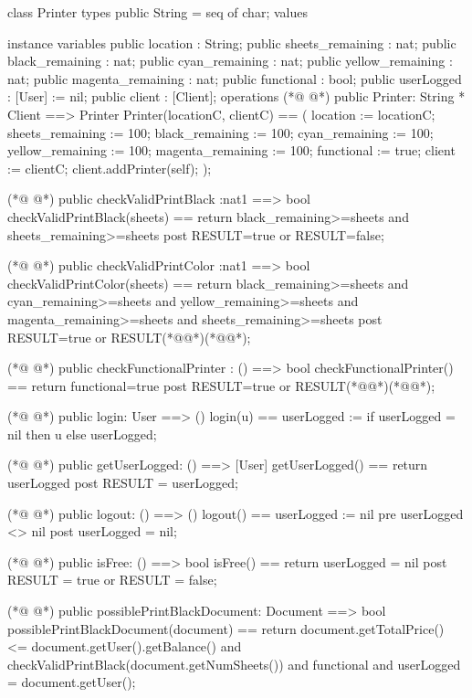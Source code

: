 \begin{vdmpp}[breaklines=true]
class Printer
types
public String = seq of char;
values

instance variables
 public location : String;
 public sheets_remaining : nat;
 public black_remaining : nat;
 public cyan_remaining : nat;
 public yellow_remaining : nat;
 public magenta_remaining : nat;
 public functional : bool;
 public userLogged : [User] := nil;
 public client : [Client];
operations
(*@
\label{Printer:17}
@*)
  public Printer: String * Client  ==> Printer
  Printer(locationC, clientC) == (
   location := locationC;
   sheets_remaining := 100;
   black_remaining := 100;
   cyan_remaining := 100;
   yellow_remaining := 100;
   magenta_remaining := 100;
   functional := true;
   client := clientC;
   client.addPrinter(self);
  );
  
(*@
\label{checkValidPrintBlack:30}
@*)
  public checkValidPrintBlack :nat1 ==> bool
  checkValidPrintBlack(sheets) ==
   return black_remaining>=sheets and sheets_remaining>=sheets
    post RESULT=true or RESULT=false;
    
(*@
\label{checkValidPrintColor:35}
@*)
  public checkValidPrintColor :nat1 ==> bool
  checkValidPrintColor(sheets) == 
   return black_remaining>=sheets and cyan_remaining>=sheets and yellow_remaining>=sheets and 
      magenta_remaining>=sheets and sheets_remaining>=sheets
    post RESULT=true or RESULT(*@\vdmnotcovered{=}@*)(*@@*);
    
(*@
\label{checkFunctionalPrinter:41}
@*)
  public checkFunctionalPrinter : () ==> bool
  checkFunctionalPrinter() ==
   return functional=true
    post RESULT=true or RESULT(*@\vdmnotcovered{=}@*)(*@@*);
    
    
(*@
\label{login:47}
@*)
   public login: User ==> ()
  login(u) ==
    userLogged := if userLogged = nil then u else userLogged;
    
(*@
\label{getUserLogged:51}
@*)
   public getUserLogged: () ==> [User]
  getUserLogged() ==
    return userLogged
    post RESULT = userLogged;

(*@
\label{logout:56}
@*)
 public logout: () ==> ()
 logout() ==
  userLogged := nil
  pre userLogged <> nil
  post userLogged = nil;
 
(*@
\label{isFree:62}
@*)
 public isFree: () ==> bool
 isFree() ==
  return userLogged = nil
  post RESULT = true or RESULT = false;  
  
(*@
\label{possiblePrintBlackDocument:67}
@*)
 public possiblePrintBlackDocument: Document ==> bool
 possiblePrintBlackDocument(document) ==
  return document.getTotalPrice() <= document.getUser().getBalance() 
   and checkValidPrintBlack(document.getNumSheets())
   and functional
   and userLogged = document.getUser();
 

\end{vdmpp}
